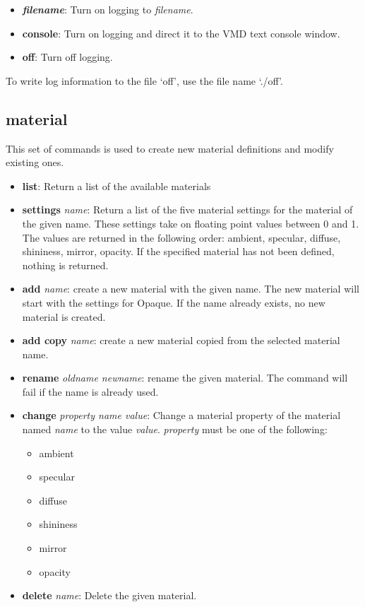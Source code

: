   \begin{itemize}
    \item {\bf {\it filename}}: Turn on logging to {\it filename}.
    \item {\bf console}: Turn on logging and direct it to the VMD 
                         text console window.
    \item {\bf off}: Turn off logging.
  \end{itemize}
  To write log information to the file `off', use the file name `./off'.


\subsection{material}
This set of commands is used to create new material definitions and modify
existing ones.

\begin{itemize}
  \item {\bf list}: Return a list of the available materials
  \item {\bf settings} {\em name}: Return a list of the five material settings
    for the material of the given name.  These settings take on floating point
    values between 0 and 1.  The values are returned in the 
    following order: ambient, specular, diffuse, shininess, mirror, opacity.  If the
    specified material has not been defined, nothing is returned.
  \item {\bf add} {\em name}: create a new material with the given name.  
    The new material will start with the settings for {\sf Opaque}.  If 
    the name already exists, no new material is created.
  \item {\bf add copy} {\em name}: create a new material copied from 
    the selected material name.
  \item {\bf rename} {\em oldname newname}: rename the given material.  The
    command will fail if the name is already used.  
  \item {\bf change} {\em property name value}: Change a material property
    of the material named {\em name} to the value {\em value}.  {\em property}
    must be one of the following:
    \begin{itemize}
      \item ambient
      \item specular 
      \item diffuse 
      \item shininess 
      \item mirror 
      \item opacity 
    \end{itemize}
  \item {\bf delete} {\em name}: Delete the given material.
\end{itemize}


